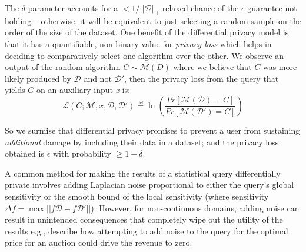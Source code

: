\documentclass[letterpaper]{article}
\begin{document}
The \begin{math} \delta \end{math} parameter accounts for a $  < 1 / ||\mathcal{D}||_1 $ relaxed chance of the \begin{math} \epsilon \end{math} guarantee not holding -- otherwise, it will be equivalent to just selecting a random sample on the order of the size of the dataset. One benefit of the differential privacy model is that it has a quantifiable, non binary value for \textit{privacy loss} which helps in deciding to comparatively select one algorithm over the other. We observe an output of the random algorithm \begin{math} C \sim \mathcal{M}(D) \end{math} where we believe that \begin{math} C \end{math} was more likely produced by $\mathcal{D}$ and not $\mathcal{D'}$, then the privacy loss from the query that yields \begin{math} C \end{math} on an auxiliary input \textit{x} is: \begin{equation} \mathcal{L}(C;\mathcal{M},x,\mathcal{D},\mathcal{D'}) \overset{\underset{\mathrm{def}}{}}{=} \ln(\frac{Pr[\mathcal{M}(\mathcal{D}) = C]}{Pr[\mathcal{M}(\mathcal{D'}) = C]}) \end{equation}

So we surmise that differential privacy promises to prevent a user from sustaining \textit{additional} damage by including their data in a dataset; and the privacy loss obtained is \begin{math} \epsilon \end{math} with probability \begin{math} \ge 1-\delta \end{math}. 

A common method for making the results of a statistical query differentially private involves adding Laplacian noise proportional to either the query's global sensitivity \cite{dwork2008differential,dwork2006calibrating} or the smooth bound of the local sensitivity \cite{nissim2007smooth} (where sensitivity $\Delta f = \max||f\mathcal{D} - f\mathcal{D}'||$). However, for non-continuous domains, adding noise can result in unintended consequences that completely wipe out the utility of the results e.g., \cite{dwork2014algorithmic} describe how attempting to add noise to the query for the optimal price for an auction could drive the revenue to zero. 
\end{document}
